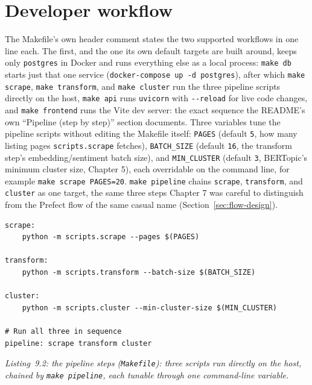 \section{Developer workflow}
\label{sec:dev-workflow}
\begin{sloppypar}
The Makefile's own header comment states the two supported workflows in one line each. The first, and the one its own default targets are built around, keeps only \texttt{postgres} in Docker and runs everything else as a local process: \texttt{make db} starts just that one service (\texttt{docker-compose up -d postgres}), after which \texttt{make scrape}, \texttt{make transform}, and \texttt{make cluster} run the three pipeline scripts directly on the host, \texttt{make api} runs \texttt{uvicorn} with \texttt{-{}-reload} for live code changes, and \texttt{make frontend} runs the Vite dev server: the exact sequence the README's own ``Pipeline (step by step)'' section documents. Three variables tune the pipeline scripts without editing the Makefile itself: \texttt{PAGES} (default \texttt{5}, how many listing pages \texttt{scripts.scrape} fetches), \texttt{BATCH\_SIZE} (default \texttt{16}, the transform step's embedding/sentiment batch size), and \texttt{MIN\_CLUSTER} (default \texttt{3}, BERTopic's minimum cluster size, Chapter 5), each overridable on the command line, for example \texttt{make scrape PAGES=20}. \texttt{make pipeline} chains \texttt{scrape}, \texttt{transform}, and \texttt{cluster} as one target, the same three steps Chapter 7 was careful to distinguish from the Prefect flow of the same casual name (Section~\ref{sec:flow-design}).
\end{sloppypar}

\begin{verbatim}
scrape:
	python -m scripts.scrape --pages $(PAGES)

transform:
	python -m scripts.transform --batch-size $(BATCH_SIZE)

cluster:
	python -m scripts.cluster --min-cluster-size $(MIN_CLUSTER)

# Run all three in sequence
pipeline: scrape transform cluster
\end{verbatim}
\begin{center}
\textit{Listing~9.2: the pipeline steps (\texttt{Makefile}): three scripts run directly on the host, chained by \texttt{make pipeline}, each tunable through one command-line variable.}
\end{center}

